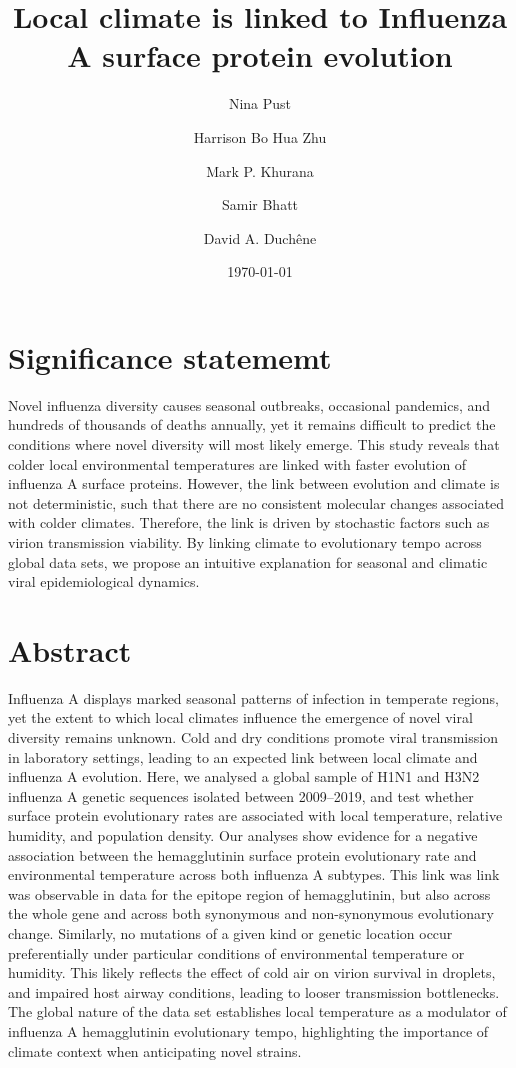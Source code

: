 \documentclass[11pt, a4paper]{article}
\title{\textbf{Local climate is linked to Influenza A surface protein evolution}}
\author[1, *]{ Nina Pust}
\author[1]{Harrison Bo Hua Zhu}
\author[1]{Mark P. Khurana}
\author[1, 2, \dag]{Samir Bhatt}
\author[1, \dag]{David A. Duchêne}
\affil[1]{Department of Public Health, University of Copenhagen, 1353 Copenhagen K, Denmark}
\affil[2]{MRC Centre for Global Infectious Disease Analysis, Imperial College London, London, United Kingdom}
\affil[*]{Corresponding author}
\affil[$\dagger$]{Equal contribution}
\date{\today}
\begin{document}
\maketitle
\linenumbers

\section*{Significance statememt}
Novel influenza diversity causes seasonal outbreaks, occasional pandemics, and hundreds of thousands of deaths annually, yet it remains difficult to predict the conditions where novel diversity will most likely emerge. This study reveals that colder local environmental temperatures are linked with faster evolution of influenza A surface proteins. However, the link between evolution and climate is not deterministic, such that there are no consistent molecular changes associated with colder climates. Therefore, the link is driven by stochastic factors such as virion transmission viability. By linking climate to evolutionary tempo across global data sets, we propose an intuitive explanation for seasonal and climatic viral epidemiological dynamics.

\section*{Abstract}
Influenza A displays marked seasonal patterns of infection in temperate regions, yet the extent to which local climates influence the emergence of novel viral diversity remains unknown. Cold and dry conditions promote viral transmission in laboratory settings, leading to an expected link between local climate and influenza A evolution. Here, we analysed a global sample of H1N1 and H3N2 influenza A genetic sequences isolated between 2009–2019, and test whether surface protein evolutionary rates are associated with local temperature, relative humidity, and population density. Our analyses show evidence for a negative association between the hemagglutinin surface protein evolutionary rate and environmental temperature across both influenza A subtypes. This link was link was observable in data for the epitope region of hemagglutinin, but also across the whole gene and across both synonymous and non-synonymous evolutionary change. Similarly, no mutations of a given kind or genetic location occur preferentially under particular conditions of environmental temperature or humidity. This likely reflects the effect of cold air on virion survival in droplets, and impaired host airway conditions, leading to looser transmission bottlenecks. The global nature of the data set establishes local temperature as a modulator of influenza A hemagglutinin evolutionary tempo, highlighting the importance of climate context when anticipating novel strains.
\end{document}
